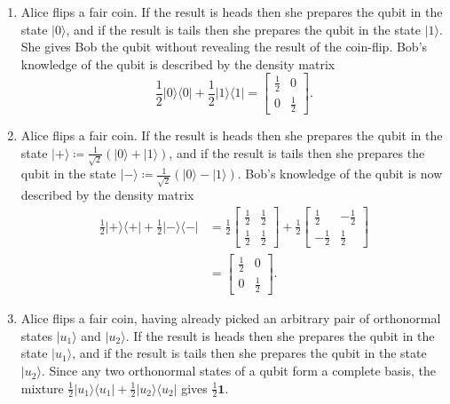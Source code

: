 \documentclass[fleqn,a4paper]{article}
\theoremstyle{definition}
\theoremstyle{definition}
\theoremstyle{definition}
\theoremstyle{definition}
\theoremstyle{remark}
\begin{document}
\begin{enumerate}
\def\labelenumi{\arabic{enumi}.}
\item
  Alice flips a fair coin.
  If the result is heads then she prepares the qubit in the state \(|0\rangle\), and if the result is tails then she prepares the qubit in the state \(|1\rangle\).
  She gives Bob the qubit without revealing the result of the coin-flip.
  Bob's knowledge of the qubit is described by the density matrix
  \[
     \frac{1}{2}|0\rangle\langle 0| + \frac{1}{2}|1\rangle\langle 1|
     = \begin{bmatrix}
       \frac{1}{2} & 0
     \\0 & \frac{1}{2}
     \end{bmatrix}.
   \]
\item
  Alice flips a fair coin.
  If the result is heads then she prepares the qubit in the state \(|+\rangle\coloneqq\frac{1}{\sqrt{2}}(|0\rangle+|1\rangle)\), and if the result is tails then she prepares the qubit in the state \(|-\rangle\coloneqq\frac{1}{\sqrt{2}}(|0\rangle-|1\rangle)\).
  Bob's knowledge of the qubit is now described by the density matrix
  \[
     \begin{aligned}
       \frac{1}{2}|+\rangle\langle+| + \frac{1}{2}|-\rangle\langle-|
       &=
       \frac{1}{2}
       \begin{bmatrix}
       \frac{1}{2} & \frac{1}{2}
       \\\frac{1}{2} & \frac{1}{2}
       \end{bmatrix}
       +\frac{1}{2}
       \begin{bmatrix}
       \frac{1}{2} & -\frac{1}{2}
       \\-\frac{1}{2} & \frac{1}{2}
       \end{bmatrix}
     \\&=
       \begin{bmatrix}
       \frac{1}{2} & 0
       \\0 & \frac{1}{2}
       \end{bmatrix}.
     \end{aligned}
   \]
\item
  Alice flips a fair coin, having already picked an arbitrary pair of orthonormal states \(|u_1\rangle\) and \(|u_2\rangle\).
  If the result is heads then she prepares the qubit in the state \(|u_1\rangle\), and if the result is tails then she prepares the qubit in the state \(|u_2\rangle\).
  Since any two orthonormal states of a qubit form a complete basis, the mixture \(\frac{1}{2}|u_1\rangle\langle u_1|+\frac{1}{2}|u_2\rangle\langle u_2|\) gives \(\frac{1}{2}\mathbf{1}\).
\end{enumerate}
\end{document}
